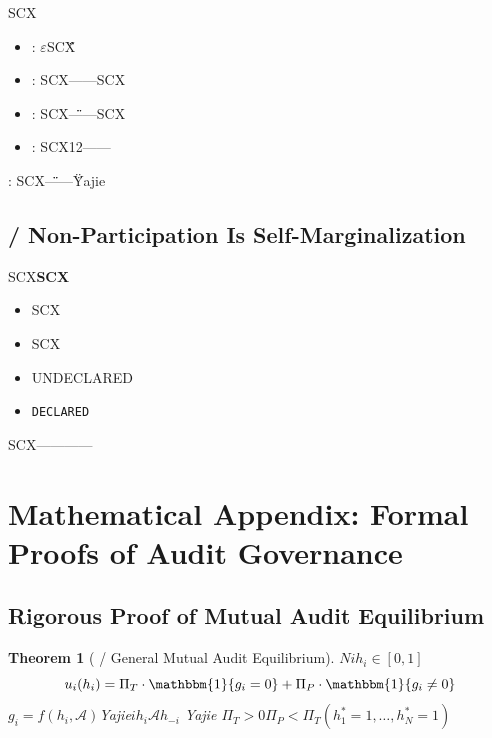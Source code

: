 \documentclass[12pt,a4paper]{article}
\newtheorem{theorem}{Theorem}[section]
\theoremstyle{remark}
\newcommand{\DECLARED}{\texttt{DECLARED}}
\newcommand{\gradient}{g}
\begin{document}
SCX

\begin{itemize}[nosep]
    \item \textbf{}: $\varepsilon$SCX\"\"
    \item \textbf{}: SCX——SCX
    \item \textbf{}: SCX\"\"——SCX
    \item \textbf{}: SCX12——
\end{itemize}

\textbf{}: SCX\"\"——\"\"Yajie

\subsection{ / Non-Participation Is Self-Marginalization}

SCX\textbf{SCX}

\begin{itemize}[nosep]
    \item SCX
    \item SCX
    \item UNDECLARED
    \item \DECLARED{}
\end{itemize}

SCX————\textbf{}


\section{}
\section{Mathematical Appendix: Formal Proofs of Audit Governance}

\subsection{}
\subsection{Rigorous Proof of Mutual Audit Equilibrium}

\begin{theorem}[ / General Mutual Audit Equilibrium]\label{thm:general_equilibrium}
    $N$$i$$h_i \in [0,1]$
    \begin{equation}
        u_i(h_i) = \Pi_T \cdot \mathbbm{1}\{\gradient_i = 0\} + \Pi_P \cdot \mathbbm{1}\{\gradient_i \neq 0\}
    \end{equation}
    $\gradient_i = f(h_i, \mathcal{A})$Yajie$i$$h_i$$\mathcal{A}$$h_{-i}$
    Yajie
    $\Pi_T > 0$$\Pi_P < \Pi_T$$(h_1^* = 1, \ldots, h_N^* = 1)$
\end{theorem}
\end{document}
